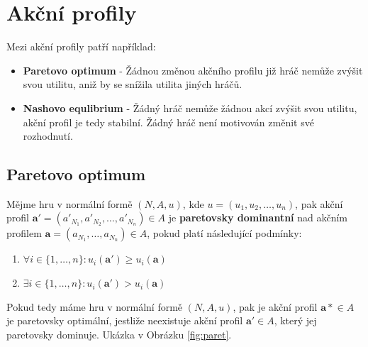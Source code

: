 \documentclass{article}
\begin{document}
\section*{Akční profily}

Mezi akční profily patří například:

\begin{itemize}
\item \textbf{Paretovo optimum} - Žádnou změnou akčního profilu již hráč nemůže zvýšit svou utilitu, aniž by se snížila utilita jiných hráčů.

\item \textbf{Nashovo equlibrium} - Žádný hráč nemůže žádnou akcí zvýšit svou utilitu, akční profil je tedy stabilní. Žádný hráč není motivován změnit své rozhodnutí.
\end{itemize}

\subsection*{Paretovo optimum}

Mějme hru v normální formě $(N, A, u)$, kde $u=(u_1, u_2, \dots, u_n)$, pak akční profil $\boldsymbol{a'} = (a'_{N_1}, a'_{N_2}, \dots, a'_{N_n}) \in A$ je \textbf{paretovsky dominantní} nad akčním profilem $\boldsymbol{a} = (a_{N_1}, \dots, a_{N_n}) \in A$, pokud platí následující podmínky:

\begin{enumerate}
\item $\forall i \in \{1, \dots, n\}: u_i(\boldsymbol{a'}) \geq u_i(\boldsymbol{a})$

\item $\exists i \in \{ 1, \dots, n\}: u_i(\boldsymbol{a'})  > u_i(\boldsymbol{a})$
\end{enumerate}

Pokud tedy máme hru v normální formě $(N, A, u)$, pak je akční profil $\boldsymbol{a*} \in A$ je paretovsky optimální, jestliže neexistuje akční profil $\boldsymbol{a'} \in A$, který jej paretovsky dominuje. Ukázka v Obrázku \ref{fig:paret}.
\end{document}
